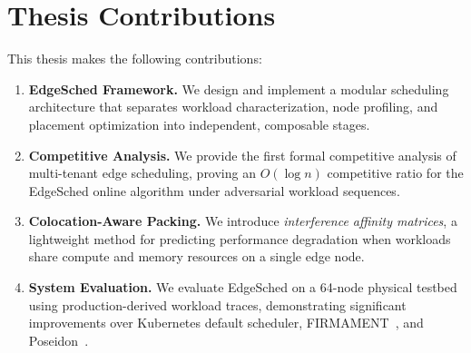 \section{Thesis Contributions}

This thesis makes the following contributions:

\begin{enumerate}[leftmargin=*,itemsep=6pt]
    \item \textbf{EdgeSched Framework.} We design and implement a modular scheduling architecture that separates workload characterization, node profiling, and placement optimization into independent, composable stages.

    \item \textbf{Competitive Analysis.} We provide the first formal competitive analysis of multi-tenant edge scheduling, proving an \(O(\log n)\) competitive ratio for the EdgeSched online algorithm under adversarial workload sequences.

    \item \textbf{Colocation-Aware Packing.} We introduce \textit{interference affinity matrices}, a lightweight method for predicting performance degradation when workloads share compute and memory resources on a single edge node.

    \item \textbf{System Evaluation.} We evaluate EdgeSched on a 64-node physical testbed using production-derived workload traces, demonstrating significant improvements over Kubernetes default scheduler, FIRMAMENT~\cite{gog2016}, and Poseidon~\cite{gupta2021}.

\end{enumerate}
